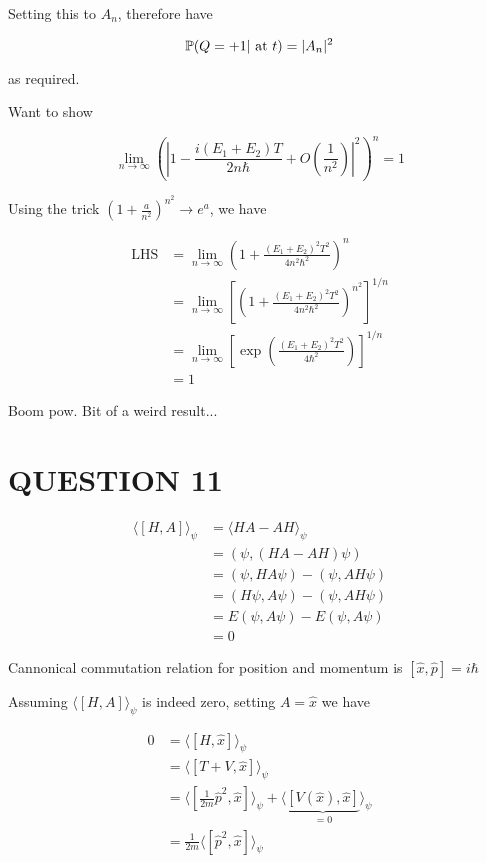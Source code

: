 \documentclass[a4paper]{article}
\begin{document}
Setting this to $ A_{n} $, therefore have

\[ \P( Q = +1 | \text{ at } t )  =  | A_{n} |^{2} \]

as required.

Want to show 

\[ \lim\limits_{n \to \infty} \left(  \left| 1 - \frac{i(E_{1} + E_{2})T}{2 n \hbar} + O\left( \frac{1}{n^{2}}\right) \right|^{2}   \right)^{n} = 1   \]

Using the trick $ \left( 1 + \frac{a}{n^{2}} \right)^{n^{2}} \to e^{a}  $, we have


\begin{align*}
\text{LHS} & = \lim\limits_{n \to \infty} \left(  1 + \frac{(E_{1} + E_{2})^{2}T^{2}}{4 n^{2} \hbar^{2}}   \right)^{n}  \\
& = \lim\limits_{n \to \infty} \left[  \left(  1 + \frac{(E_{1} + E_{2})^{2}T^{2}}{4 n^{2} \hbar^{2}}   \right)^{n^{2}} \right]^{1/n} \\
& = \lim\limits_{n \to \infty} \left[ \exp \left(  \frac{(E_{1} + E_{2})^{2}T^{2}}{4 \hbar^{2}} \right)  \right]^{1/n} \\
& = 1
\end{align*}

Boom pow. Bit of a weird result...

\section{QUESTION 11}

\begin{align*}
\langle [H,A] \rangle_{\psi} & = \langle HA - AH \rangle_{\psi}  \\
& = (  \psi, (HA - AH)\psi ) \\
& = ( \psi, HA \psi) - ( \psi, AH \psi) \\
& = ( H \psi, A \psi) - ( \psi, AH \psi) \\
& = E ( \psi, A \psi) - E ( \psi, A \psi) \\
& = 0
\end{align*}


Cannonical commutation relation for position and momentum is $ [\hat{x},\hat{p}] = i \hbar $

Assuming $ \langle [H,A] \rangle_{\psi} $ is indeed zero, setting $ A = 
\hat{x} $ we have

\begin{align*}
0 & = \langle [H,\hat{x}] \rangle_{\psi} \\
& = \langle [T + V,\hat{x}] \rangle_{\psi} \\
& = \langle [\frac{1}{2m} \hat{p}^{2},\hat{x}] \rangle_{\psi} + \langle \underbrace{[V(\hat{x}),\hat{x}]}_{= 0} \rangle_{\psi} \\
& = \frac{1}{2m} \langle [ \hat{p}^{2},\hat{x}] \rangle_{\psi}
\end{align*} 
\end{document}
